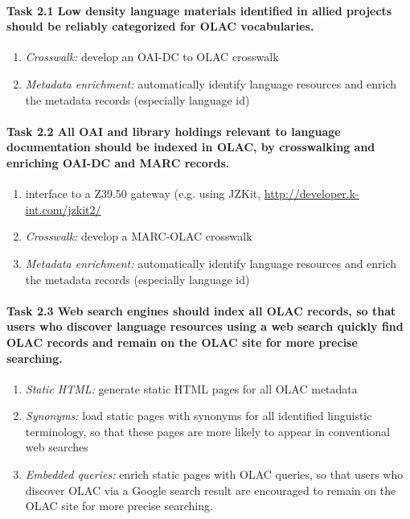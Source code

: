 \def\task{2.1}
\paragraph{Task {\task} Low density language materials identified in allied projects
      should be reliably categorized for OLAC vocabularies.}

\begin{enumerate}[label=\emph{\task\alph*}]
\item \emph{Crosswalk:}
  develop an OAI-DC to OLAC crosswalk
\item \emph{Metadata enrichment:}
  automatically identify language resources and
  enrich the metadata records (especially language id)
\end{enumerate}

\def\task{2.2}
\paragraph{Task {\task} All OAI and library holdings relevant to language
      documentation should be indexed in OLAC, by
      crosswalking and enriching OAI-DC and MARC records.}

\begin{enumerate}[label=\emph{\task\alph*}]
\item interface to a Z39.50 gateway (e.g. using JZKit,
   \url{http://developer.k-int.com/jzkit2/}
\item \emph{Crosswalk:}
  develop a MARC-OLAC crosswalk
\item \emph{Metadata enrichment:}
  automatically identify language resources and
  enrich the metadata records (especially language id)
\end{enumerate}



\def\task{2.3}
\paragraph{Task {\task} Web search engines should index all OLAC records, so that
      users who discover language resources using a web search
      quickly find OLAC records and remain on the OLAC site for
      more precise searching.}

\begin{enumerate}[label=\emph{\task\alph*}]
\item \emph{Static HTML:}
  generate static HTML pages for all OLAC metadata
\item \emph{Synonyms:}
  load static pages with synonyms for all identified linguistic
  terminology, so that these pages are more likely to appear in
  conventional web searches
\item \emph{Embedded queries:}
  enrich static pages with OLAC queries, so that users who discover
  OLAC via a Google search result are encouraged to remain on the
  OLAC site for more precise searching.
\end{enumerate}


